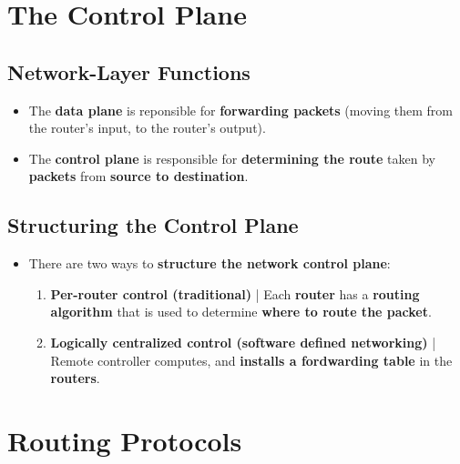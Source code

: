 \documentclass{article}
\begin{document}
    \section*{The Control Plane}

    \subsection*{Network-Layer Functions}
    \begin{itemize}
        \item The \textbf{data plane} is reponsible for \textbf{forwarding packets} (moving them from the router's input, to the router's output).
        \item The \textbf{control plane} is responsible for \textbf{determining the route} taken by \textbf{packets} from \textbf{source to destination}. 
    \end{itemize}

    \subsection*{Structuring the Control Plane}
    \begin{itemize}
        \item There are two ways to \textbf{structure the network control plane}:
        \begin{enumerate}
            \item \textbf{Per-router control (traditional)} | Each \textbf{router} has a \textbf{routing algorithm} that is used to determine \textbf{where to route the packet}.
            \item \textbf{Logically centralized control (software defined networking)} | Remote controller computes, and \textbf{installs a fordwarding table} in the \textbf{routers}.
        \end{enumerate}
    \end{itemize}

    \section*{Routing Protocols}
    
\end{document}
